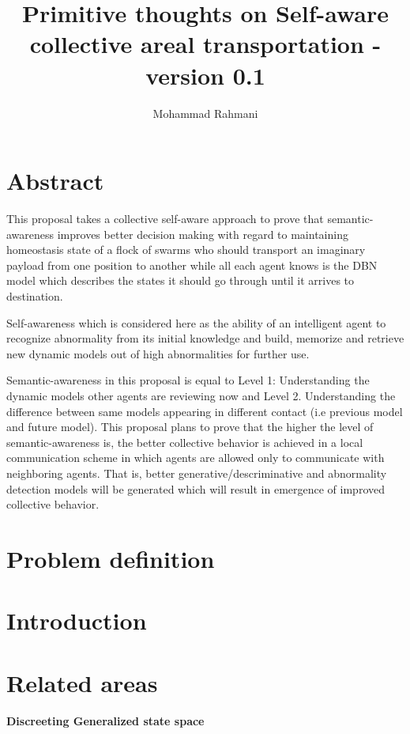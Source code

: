 \documentclass{article}
\begin{document}
	
	\title{Primitive thoughts on Self-aware collective areal transportation - version 0.1}
	\author{Mohammad Rahmani}
	\date{}
	\maketitle
	\section{Abstract}
	This proposal takes a collective self-aware approach to prove that semantic-awareness improves better decision making with regard to maintaining homeostasis state of a flock of swarms who should transport an imaginary payload from one position to another while all each agent knows is the DBN model which describes the states it should go through until it arrives to destination. 
	
	Self-awareness which is considered here as the ability of an intelligent agent to recognize abnormality from its initial knowledge and build, memorize and retrieve new dynamic models out of high abnormalities for further use. 
	
	Semantic-awareness in this proposal is equal to  Level 1: Understanding the dynamic models other agents are reviewing now and Level 2. Understanding the difference between same models appearing in different contact (i.e previous model and future model). This proposal plans to prove that the higher the level of semantic-awareness is, the better collective behavior is achieved in a local communication scheme in which agents are allowed only to communicate with neighboring agents. That is, better generative/descriminative and abnormality detection models will be generated which will result in emergence of improved collective behavior.  
	
	
	\section{Problem definition}
	\section{Introduction}
	\section{Related areas}
		\paragraph{Discreeting Generalized state space}
\end{document}
